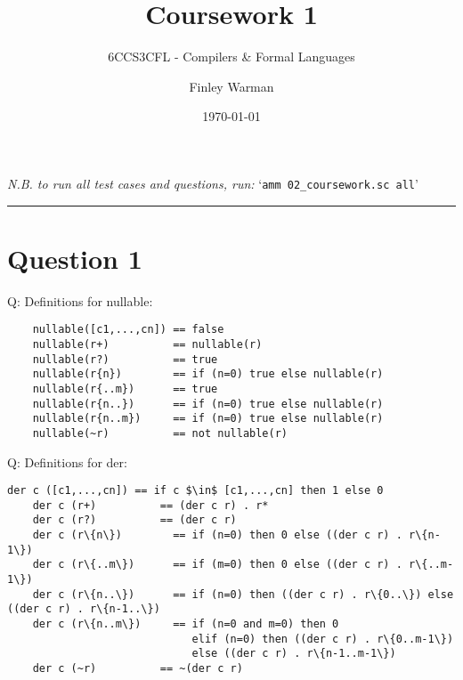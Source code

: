 \documentclass[english]{scrartcl}
\begin{document}


\subtitle{6CCS3CFL - Compilers \& Formal Languages}
\title{Coursework 1}
\author{Finley Warman}
\date{\today}

\maketitle

\begin{center}
    \textit{N.B. to run all test cases and questions, run:} `\verb|amm 02_coursework.sc all|'
\end{center}


\tableofcontents
\par\noindent\rule{\textwidth}{0.4pt}



\newpage

\section*{Question 1}
Q: Definitions for nullable:
\\
\begin{verbatim}
    nullable([c1,...,cn]) == false
    nullable(r+)          == nullable(r)
    nullable(r?)          == true
    nullable(r{n})        == if (n=0) true else nullable(r)
    nullable(r{..m})      == true
    nullable(r{n..})      == if (n=0) true else nullable(r)
    nullable(r{n..m})     == if (n=0) true else nullable(r)
    nullable(~r)          == not nullable(r)
\end{verbatim}


Q: Definitions for der:
\\
\begin{Verbatim}[mathescape,commandchars=\\\{\}]
    der c ([c1,...,cn]) == if c $\in$ [c1,...,cn] then 1 else 0
    der c (r+)          == (der c r) . r*
    der c (r?)          == (der c r)
    der c (r\{n\})        == if (n=0) then 0 else ((der c r) . r\{n-1\})
    der c (r\{..m\})      == if (m=0) then 0 else ((der c r) . r\{..m-1\})
    der c (r\{n..\})      == if (n=0) then ((der c r) . r\{0..\}) else ((der c r) . r\{n-1..\})
    der c (r\{n..m\})     == if (n=0 and m=0) then 0
                             elif (n=0) then ((der c r) . r\{0..m-1\})
                             else ((der c r) . r\{n-1..m-1\})
    der c (~r)          == ~(der c r)
\end{Verbatim}
\end{document}
